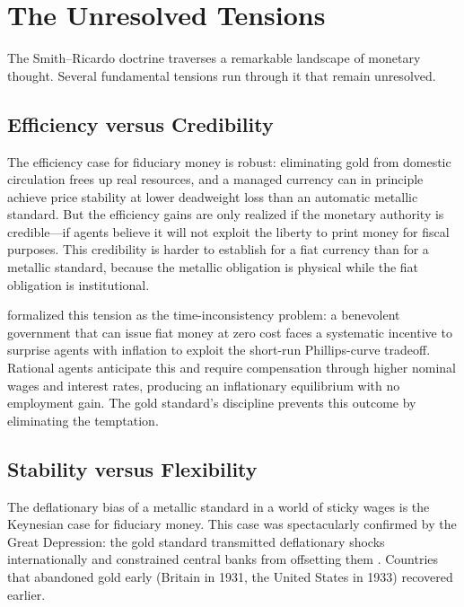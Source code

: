 \documentclass[12pt]{article}
\begin{document}
\section{The Unresolved Tensions}
\label{sec:tensions}

The Smith--Ricardo doctrine traverses a remarkable landscape of
monetary thought.  Several fundamental tensions run through it that
remain unresolved.

\subsection{Efficiency versus Credibility}

The efficiency case for fiduciary money is robust: eliminating gold
from domestic circulation frees up real resources, and a managed
currency can in principle achieve price stability at lower deadweight
loss than an automatic metallic standard.  But the efficiency gains
are only realized if the monetary authority is credible---if agents
believe it will not exploit the liberty to print money for fiscal
purposes.  This credibility is harder to establish for a fiat
currency than for a metallic standard, because the metallic
obligation is physical while the fiat obligation is institutional.

\citet{BarroGordon1983} formalized this tension as the time-inconsistency
problem: a benevolent government that can issue fiat money at zero
cost faces a systematic incentive to surprise agents with inflation
to exploit the short-run Phillips-curve tradeoff.  Rational agents
anticipate this and require compensation through higher nominal wages
and interest rates, producing an inflationary equilibrium with no
employment gain.  The gold standard's discipline prevents this
outcome by eliminating the temptation.

\subsection{Stability versus Flexibility}

The deflationary bias of a metallic standard in a world of sticky
wages is the Keynesian case for fiduciary money.  This case was
spectacularly confirmed by the Great Depression: the gold standard
transmitted deflationary shocks internationally and constrained
central banks from offsetting them
\citep{BernankeJames1991, Eichengreen1992}.  Countries that
abandoned gold early (Britain in 1931, the United States in 1933)
recovered earlier.
\end{document}

